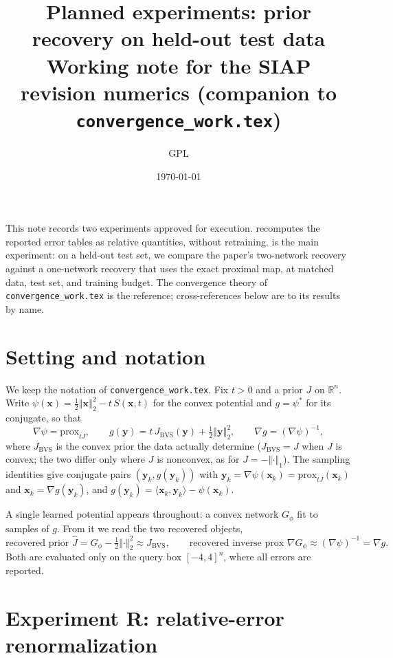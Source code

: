 \documentclass[11pt]{article}
\title{Planned experiments: prior recovery on held-out test data\\[1ex]
\large Working note for the SIAP revision numerics (companion to \texttt{convergence\_work.tex})}
\author{GPL}
\date{\today}
\theoremstyle{definition}
\theoremstyle{remark}
\def\R {\mathbb{R}}
\def\Rn {\R^n}
\newcommand{\normsq}[1]{\left\Vert{#1} \right\Vert_{2}^{2}}
\newcommand{\normone}[1]{\left\Vert{#1} \right\Vert_{1}}
\def\bx {\boldsymbol{x}}
\def\by {\boldsymbol{y}}
\def\JBVS {J_{\text{BVS}}}
\def\prox {\mathrm{prox}}
\def\GNN {G_{\phi}}
\begin{document}
\sloppy

\maketitle

\noindent This note records two experiments approved for execution.
 recomputes the reported error tables as relative quantities, without retraining.
 is the main experiment: on a held-out test set, we compare the paper's two-network recovery against a one-network recovery that uses the exact proximal map, at matched data, test set, and training budget.
The convergence theory of \texttt{convergence\_work.tex} is the reference; cross-references below are to its results by name.

\section{Setting and notation}
\label{sec:setting}

We keep the notation of \texttt{convergence\_work.tex}.
Fix $t > 0$ and a prior $J$ on $\Rn$.
Write $\psi(\bx) = \tfrac12\normsq{\bx} - t\,S(\bx,t)$ for the convex potential and $g = \psi^{*}$ for its conjugate, so that
\begin{equation}
\label{eq:maps}
\nabla\psi = \prox_{tJ}, \qquad g(\by) = t\,\JBVS(\by) + \tfrac12\normsq{\by}, \qquad \nabla g = (\nabla\psi)^{-1},
\end{equation}
where $\JBVS$ is the convex prior the data actually determine ($\JBVS = J$ when $J$ is convex; the two differ only where $J$ is nonconvex, as for $J = -\normone{\cdot}$).
The sampling identities give conjugate pairs $(\by_{k}, g(\by_{k}))$ with $\by_{k} = \nabla\psi(\bx_{k}) = \prox_{tJ}(\bx_{k})$ and $\bx_{k} = \nabla g(\by_{k})$, and $g(\by_{k}) = \langle\bx_{k},\by_{k}\rangle - \psi(\bx_{k})$.

A single learned potential appears throughout: a convex network $\GNN$ fit to samples of $g$.
From it we read the two recovered objects,
\begin{equation}
\label{eq:recovered}
\text{recovered prior } \hat{J} = \GNN - \tfrac12\normsq{\cdot} \approx \JBVS, \qquad
\text{recovered inverse prox } \nabla\GNN \approx (\nabla\psi)^{-1} = \nabla g .
\end{equation}
Both are evaluated only on the query box $[-4,4]^{n}$, where all errors are reported.

\section{Experiment R: relative-error renormalization}
\label{sec:rel}
\end{document}
